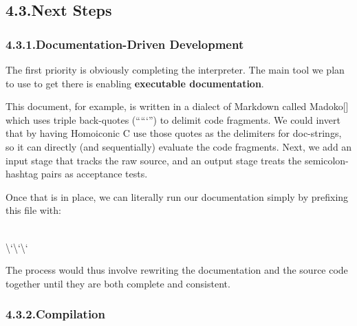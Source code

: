 \documentclass[preprint]{{acmart}}
\begin{document}
\subsection{4.3.\hspace*{0.5em}Next Steps}\label{sec-next-steps}%

\subsubsection{4.3.1.\hspace*{0.5em}Documentation-Driven Development}\label{sec-documentation-driven-development}%

\noindent{}The first priority is obviously completing the interpreter. The main tool
we plan to use to get there is enabling \textbf{executable documentation}.%

This document, for example, is written in a dialect of Markdown called
Madoko[] which uses triple back-quotes (\textquotedblleft{}```\textquotedblright{}) to delimit code
fragments. We could invert that by having Homoiconic C use those quotes
as the delimiters for doc-strings, so it can directly (and sequentially)
evaluate the code fragments. Next, we add an input stage that tracks the
raw source, and an output stage treats the semicolon-hashtag pairs as
acceptance tests.%

Once that is in place, we can literally run our documentation simply by prefixing
this file with:%
\begin{mdpre}%
\\
\textbackslash{}{`}{\textbackslash{}`}{\textbackslash{}`}%
\end{mdpre}\noindent{}The process would thus involve rewriting the documentation and 
the source code together until they are both complete and consistent. 

\subsubsection{4.3.2.\hspace*{0.5em}Compilation}\label{sec-compilation}%
\end{document}
